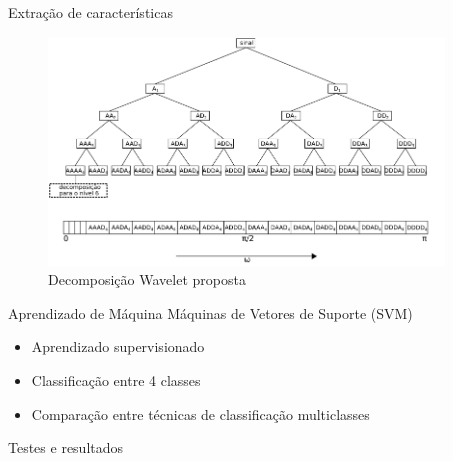 \documentclass[10pt]{beamer}
\begin{document}
\begin{frame}{Extração de características}
  \begin{figure}[]
    \centering
    \includegraphics[width=10.5cm]{images/waveletProposal.png}
    \caption{Decomposição Wavelet proposta}
  \end{figure}
\end{frame}

\begin{frame}{Aprendizado de Máquina}
    Máquinas de Vetores de Suporte (SVM)
    \begin{itemize}
      \item Aprendizado supervisionado
      \item Classificação entre 4 classes
      \item Comparação entre técnicas de classificação multiclasses
    \end{itemize}
\end{frame}

\begin{frame}{Testes e resultados}
    
\end{frame}
\end{document}
